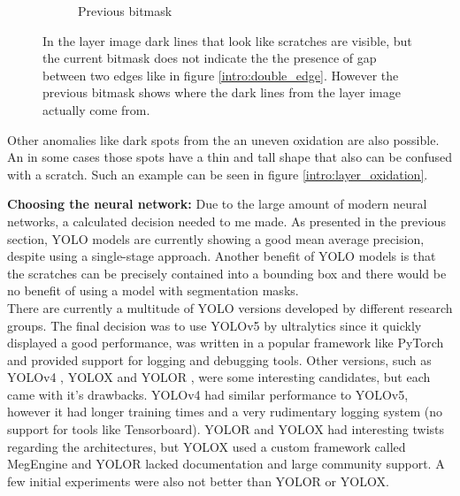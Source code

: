 \begin{figure}[!h]
\begin{subfigure}{.33\textwidth}
  \caption{Previous bitmask}
\end{subfigure}
\caption{In the layer image dark lines that look like scratches are visible, but the current bitmask does not indicate the the presence of gap between two edges like in figure \ref{intro:double_edge}. However the previous bitmask shows where the dark lines from the layer image actually come from.}
\label{intro:image_artifacts}
\end{figure}

Other anomalies like dark spots from the an uneven oxidation are also possible. An in some cases those spots have a thin and tall shape that also can be confused with a scratch. Such an example can be seen in figure \ref{intro:layer_oxidation}.


\textbf{Choosing the neural network:}
Due to the large amount of modern neural networks, a calculated decision needed to me made. As presented in the previous section, YOLO models are currently showing a good mean average precision, despite using a single-stage approach. Another benefit of YOLO models is that the scratches can be precisely contained into a bounding box and there would be no benefit of using a model with segmentation masks. \\
There are currently a multitude of YOLO versions developed by different research groups. The final decision was to use YOLOv5 by ultralytics \cite{yolov5_git} since it quickly displayed a good performance, was written in a popular framework like PyTorch and provided support for logging and debugging tools. Other versions, such as YOLOv4 \cite{yolov4_paper}, YOLOX \cite{yolox_paper} and YOLOR \cite{yolor_paper}, were some interesting candidates, but each came with it's drawbacks. YOLOv4 had similar performance to YOLOv5, however it had longer training times and a very rudimentary logging system (no support for tools like Tensorboard). YOLOR and YOLOX had interesting twists regarding the architectures, but YOLOX used a custom framework called MegEngine \cite{megengine_git} and YOLOR lacked documentation and large community support. A few initial experiments were also not better than YOLOR or YOLOX. \\



